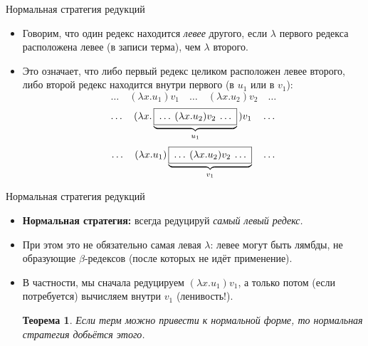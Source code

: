 \documentclass[xcolor=dvipsnames]{beamer}
\newtheorem{theoremr}{Теорема}
\begin{document}
\begin{frame}{Нормальная стратегия редукций}

\begin{itemize}[<+->]
 \item Говорим, что один редекс находится {\em левее} другого, если $\lambda$ первого редекса расположена левее (в записи терма), чем $\lambda$ второго.
 
 \item Это означает, что либо первый редекс целиком расположен левее второго, либо второй редекс находится внутри первого (в $u_1$ или в $v_1$):
 \[
 \ldots\quad (\lambda x.u_1)v_1 \quad \ldots\quad (\lambda x.u_2)v_2 \quad \ldots
 \]
 \[
  \ldots \quad 
  (\lambda x. 
  \underbrace{\mbox{\fbox{$\:\ldots\: (\lambda x.u_2)v_2 \:\ldots\:$}}}_{u_1}\,) v_1 \quad \ldots
 \]
 \[
  \ldots \quad
  (\lambda x. u_1)
  \underbrace{\mbox{\fbox{$\:\ldots\: (\lambda x.u_2)v_2 \:\ldots\:$}}}_{v_1}
  \quad\ldots
 \]


\end{itemize}

 
\end{frame}




\begin{frame}{Нормальная стратегия редукций}

\begin{itemize}[<+->]
 \item {\bf Нормальная стратегия:} всегда редуцируй {\em самый левый редекс.}
 \item При этом это не обязательно самая левая $\lambda$: левее могут быть лямбды, не образующие $\beta$-редексов (после которых не идёт применение).
 \item В частности, мы сначала редуцируем $(\lambda x . u_1) v_1$, а только потом (если потребуется) вычисляем внутри $v_1$ (ленивость!).
 \begin{theoremr}
  Если терм можно привести к нормальной форме, то нормальная стратегия добьётся этого.
 \end{theoremr}

\end{itemize}

 
\end{frame}
\end{document}
